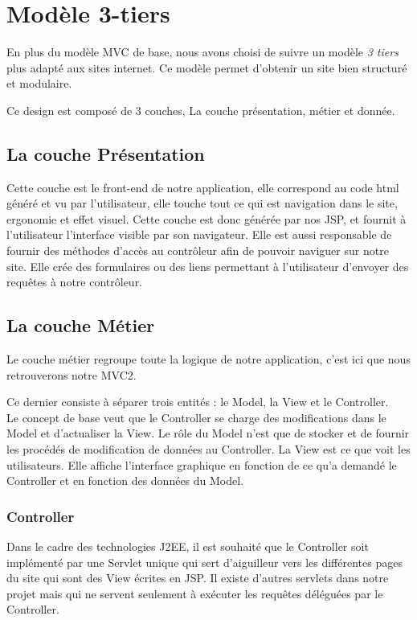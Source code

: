 \section{Modèle 3-tiers}
En plus du modèle MVC de base, nous avons choisi de suivre un modèle \emph{3 tiers} plus adapté aux sites internet.
Ce modèle permet d'obtenir un site bien structuré et modulaire.

Ce design est composé de 3 couches,
La couche présentation, métier et donnée.

\subsection{La couche Présentation}
Cette couche est le front-end de notre application, elle correspond au code html 
généré et vu par l'utilisateur, elle touche tout ce qui est navigation dans le site, 
ergonomie et effet visuel.
Cette couche est donc générée par nos JSP, et fournit à l'utilisateur l'interface visible par son navigateur.
Elle est aussi responsable de fournir des méthodes d'accès au contrôleur afin de pouvoir naviguer sur notre site.
Elle crée des formulaires ou des liens permettant à l'utilisateur d'envoyer des requêtes à notre contrôleur.

\subsection{La couche Métier}
Le couche métier regroupe toute la logique de notre application, c'est ici que nous retrouverons notre MVC2.

Ce dernier consiste à séparer trois 
entités : le Model, la View et le Controller. \\

Le concept de base veut que le Controller se charge des modifications dans le 
Model et d'actualiser la View.
Le rôle du Model n'est que de stocker et de
fournir les procédés de modification de données au Controller. La View est ce que voit les utilisateurs.
Elle affiche l'interface graphique en fonction de ce 
qu'a demandé le Controller et en fonction des données du Model.

\subsubsection{Controller}
Dans le cadre des technologies J2EE, il est souhaité que le Controller soit 
implémenté par une Servlet unique qui sert d'aiguilleur vers les différentes 
pages du site qui sont des View écrites en JSP. Il existe d'autres servlets 
dans notre projet mais qui ne servent seulement à exécuter les requêtes déléguées par le Controller.

